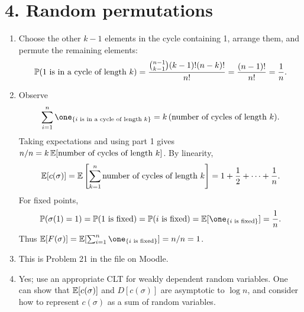 \documentclass[a4paper]{article}
\begin{document}
\section*{4. Random permutations}
\begin{enumerate}
\item Choose the other $k-1$ elements in the cycle containing 1, arrange them, and permute the remaining elements:
\[
\P(1\text{ is in a cycle of length }k)
=\frac{\binom{n-1}{k-1}(k-1)!(n-k)!}{n!}
=\frac{(n-1)!}{n!}=\frac1n.
\]
\item Observe
\[
\sum_{i=1}^n\one_{\{i\text{ is in a cycle of length }k\}}
=k\,(\text{number of cycles of length }k).
\]
Taking expectations and using part 1 gives $n/n=k\,\E[\text{number of cycles of length }k]$. By linearity,
\[
\E[c(\sigma)]=\E\left[\sum_{k=1}^n\text{number of cycles of length }k\right]
=1+\frac12+\dots+\frac1n.
\]
For fixed points,
\[
\P(\sigma(1)=1)=\P(1\text{ is fixed})=\P(i\text{ is fixed})
=\E[\one_{\{i\text{ is fixed}\}}]=\frac1n.
\]
Thus $\E[F(\sigma)]=\E[\sum_{i=1}^n\one_{\{i\text{ is fixed}\}}]=n/n=1$.
\item This is Problem 21 in the file on Moodle.
\item Yes; use an appropriate CLT for weakly dependent random variables. One can show that $\E[c(\sigma)]$ and $D[c(\sigma)]$ are asymptotic to $\log n$, and consider how to represent $c(\sigma)$ as a sum of random variables.
\end{enumerate}
\end{document}
